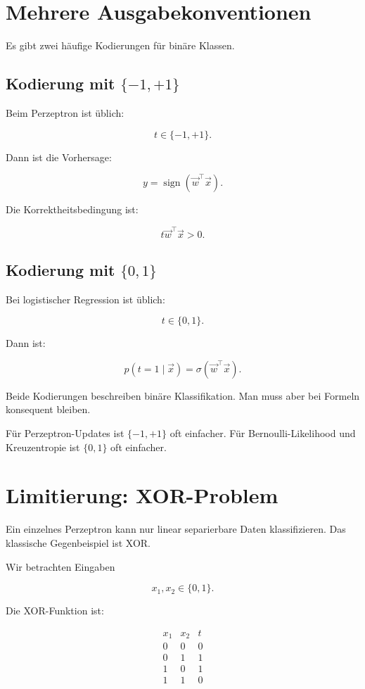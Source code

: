 \section{Mehrere Ausgabekonventionen}

Es gibt zwei häufige Kodierungen für binäre Klassen.

\subsection{Kodierung mit \(\{-1,+1\}\)}

Beim Perzeptron ist üblich:

\[
    t \in \{-1,+1\}.
\]

Dann ist die Vorhersage:

\[
    y
    =
    \operatorname{sign}(\vec{w}^{\top}\vec{x}).
\]

Die Korrektheitsbedingung ist:

\[
    t\vec{w}^{\top}\vec{x}>0.
\]

\subsection{Kodierung mit \(\{0,1\}\)}

Bei logistischer Regression ist üblich:

\[
    t \in \{0,1\}.
\]

Dann ist:

\[
    p(t=1\mid\vec{x})
    =
    \sigma(\vec{w}^{\top}\vec{x}).
\]

\begin{notebox}
Beide Kodierungen beschreiben binäre Klassifikation.
Man muss aber bei Formeln konsequent bleiben.

Für Perzeptron-Updates ist \(\{-1,+1\}\) oft einfacher.
Für Bernoulli-Likelihood und Kreuzentropie ist \(\{0,1\}\) oft einfacher.
\end{notebox}

\section{Limitierung: XOR-Problem}

Ein einzelnes Perzeptron kann nur linear separierbare Daten klassifizieren.
Das klassische Gegenbeispiel ist XOR.

Wir betrachten Eingaben

\[
    x_1,x_2 \in \{0,1\}.
\]

Die XOR-Funktion ist:

\[
\begin{array}{cc|c}
x_1 & x_2 & t \\
\hline
0 & 0 & 0 \\
0 & 1 & 1 \\
1 & 0 & 1 \\
1 & 1 & 0
\end{array}
\]

